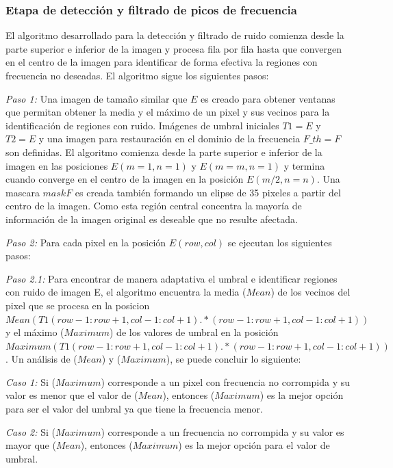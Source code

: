 \documentclass[10pt,letterpaper]{article}
\begin{document}
\subsubsection*{Etapa de detección y filtrado de picos de frecuencia}

El algoritmo desarrollado para la detección y filtrado de ruido comienza desde la parte superior e inferior de la imagen y procesa fila por fila hasta que convergen en el centro de la imagen para identificar de forma efectiva la regiones con frecuencia no deseadas. El algoritmo sigue los siguientes pasos:

\textit{Paso 1:} Una imagen de tamaño similar que $E$ es creado para obtener ventanas que permitan obtener la media y el máximo de un pixel y sus vecinos para la identificación de regiones con ruido. Imágenes de umbral iniciales $T1 = E$ y $T2 = E$ y una imagen para restauración en el dominio de la frecuencia $F\_th = F$ son definidas. El algoritmo comienza desde la parte superior e inferior de la imagen en las posiciones $E(m = 1, n = 1)$ y $E(m = m, n = 1)$ y termina cuando converge en el centro de la imagen en la posición $E(m/2, n = n)$. Una mascara $maskF$ es creada también formando un elipse de 35 pixeles a partir del centro de la imagen. Como esta región central concentra la mayoría de información de la imagen original es deseable que no resulte afectada.

\textit{Paso 2:} Para cada pixel en la posición $E(row,col)$ se ejecutan los siguientes pasos:

\textit{Paso 2.1:} Para encontrar de manera adaptativa el umbral e identificar regiones con ruido de imagen E, el algoritmo encuentra la media ($Mean$) de los vecinos del pixel que se procesa en la posicion $Mean(T1(row-1 : row+1, col-1 : col+1).*(row-1 : row+1, col-1 : col+1))$ y el máximo ($Maximum$) de los valores de umbral en la posición $Maximum(T1(row - 1 : row + 1, col - 1 : col + 1). * (row - 1 : row + 1, col - 1 : col + 1))$. Un análisis de ($Mean$) y ($Maximum$), se puede concluir lo siguiente:

\textit{Caso 1:}  Si ($Maximum$) corresponde a un pixel con frecuencia no corrompida y su valor es menor que el valor de ($Mean$), entonces ($Maximum$) es la mejor opción para ser el valor del umbral ya que tiene la frecuencia menor.

\textit{Caso 2:} Si ($Maximum$) corresponde a un frecuencia no corrompida y su valor es mayor que ($Mean$), entonces ($Maximum$) es la mejor opción para el valor de umbral.
\end{document}
